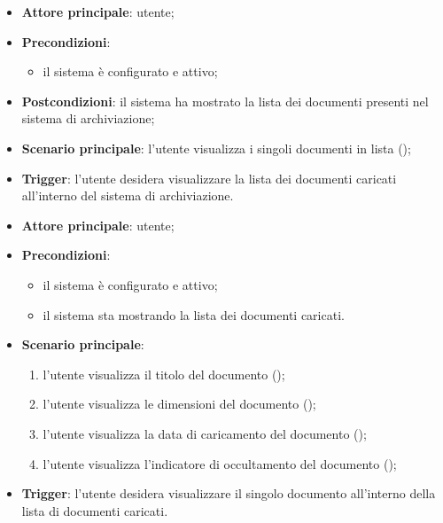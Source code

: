 \documentclass[10pt, a4paper]{article}
\begin{document}
    \begin{itemize}
        \item \textbf{Attore principale}: utente;
        \item \textbf{Precondizioni}:
            \begin{itemize}
                \item il sistema è configurato e attivo;
            \end{itemize}
        \item \textbf{Postcondizioni}: il sistema ha mostrato la lista dei documenti presenti nel sistema di archiviazione;
        \item \textbf{Scenario principale}: l'utente visualizza i singoli documenti in lista ();
        \item \textbf{Trigger}: l’utente desidera visualizzare la lista dei documenti caricati all’interno del sistema di archiviazione.
    \end{itemize}

    \begin{itemize}
        \item \textbf{Attore principale}: utente;
        \item \textbf{Precondizioni}:
            \begin{itemize}
                \item il sistema è configurato e attivo;
                \item il sistema sta mostrando la lista dei documenti caricati.
            \end{itemize}
        \item \textbf{Scenario principale}:
            \begin{enumerate}
                \item l'utente visualizza il titolo del documento ();
                \item l'utente visualizza le dimensioni del documento  ();
                \item l'utente visualizza la data di caricamento del documento ();
                \item l'utente visualizza l'indicatore di occultamento del documento ();
            \end{enumerate}
        \item \textbf{Trigger}: l’utente desidera visualizzare il singolo documento all’interno della lista di documenti caricati.
    \end{itemize}
\end{document}
